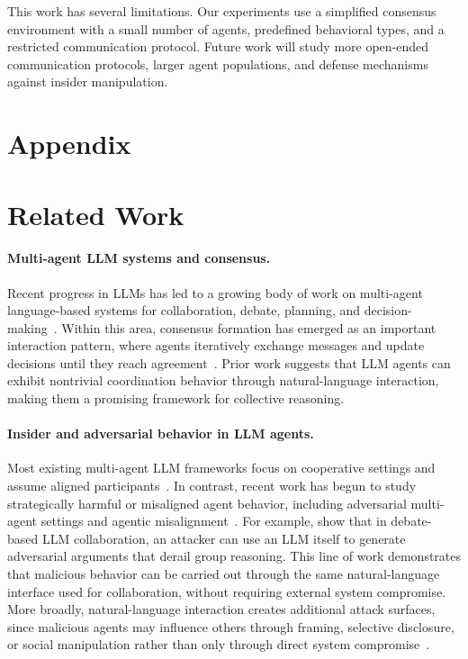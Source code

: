 \documentclass{article}
\theoremstyle{plain}
\theoremstyle{definition}
\theoremstyle{remark}
\begin{document}
This work has several limitations. Our experiments use a simplified consensus environment with a small number of agents, predefined behavioral types, and a restricted communication protocol. Future work will study more open-ended communication protocols, larger agent populations, and defense mechanisms against insider manipulation.

\newpage



\newpage
\appendix
\onecolumn
\section*{Appendix}
\section{Related Work}\label{sec:related}
\paragraph{Multi-agent LLM systems and consensus.}
Recent progress in LLMs has led to a growing body of work on multi-agent language-based systems for collaboration, debate, planning, and decision-making~\citep{li2023camel,wu2023autogen,tran2025multiagent}. Within this area, consensus formation has emerged as an important interaction pattern, where agents iteratively exchange messages and update decisions until they reach agreement~\citep{chen2023consensusllm}. Prior work suggests that LLM agents can exhibit nontrivial coordination behavior through natural-language interaction, making them a promising framework for collective reasoning.
\paragraph{Insider and adversarial behavior in LLM agents.}
Most existing multi-agent LLM frameworks focus on cooperative settings and assume aligned participants~\citep{li2023camel,wu2023autogen}. In contrast, recent work has begun to study strategically harmful or misaligned agent behavior, including adversarial multi-agent settings and agentic misalignment~\citep{anthropic2025agentic,hu2025masattack}. For example, \citet{amayuelas2024multiagent} show that in debate-based LLM collaboration, an attacker can use an LLM itself to generate adversarial arguments that derail group reasoning. This line of work demonstrates that malicious behavior can be carried out through the same natural-language interface used for collaboration, without requiring external system compromise. More broadly, natural-language interaction creates additional attack surfaces, since malicious agents may influence others through framing, selective disclosure, or social manipulation rather than only through direct system compromise~\citep{ashery2025emergent,ren2024socialnorms}.
\end{document}
